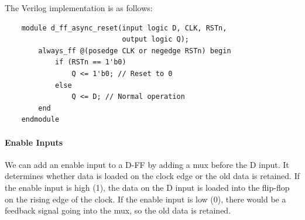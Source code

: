\documentclass[11pt]{report}
\begin{document}
\begin{definition}
    The Verilog implementation is as follows:
    \begin{verbatim}
    module d_ff_async_reset(input logic D, CLK, RSTn,
                            output logic Q);
        always_ff @(posedge CLK or negedge RSTn) begin
            if (RSTn == 1'b0)
                Q <= 1'b0; // Reset to 0
            else
                Q <= D; // Normal operation
        end
    endmodule
    \end{verbatim}
\end{definition}

\paragraph{Enable Inputs} We can add an enable input to a D-FF by adding a mux before the D input. It determines whether data is loaded on the clock edge or the old data is retained. If the enable input is high (1), the data on the D input is loaded into the flip-flop on the rising edge of the clock. If the enable input is low (0), there would be a feedback signal going into the mux, so the old data is retained.
\end{document}
